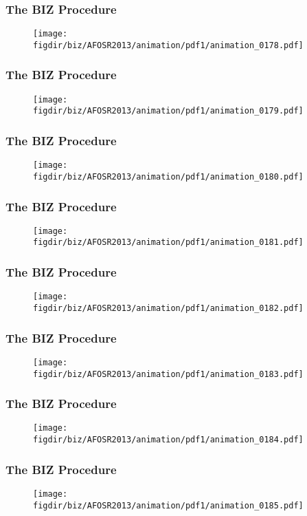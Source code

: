 \documentclass[13pt]{beamer}
\newcommand{\figdir}{../../fig}
\begin{document}
\begin{frame}\frametitle{The BIZ Procedure}\begin{figure}\texttt{[image: \\figdir/biz/AFOSR2013/animation/pdf1/animation\_0178.pdf]}\end{figure}\end{frame}
\begin{frame}\frametitle{The BIZ Procedure}\begin{figure}\texttt{[image: \\figdir/biz/AFOSR2013/animation/pdf1/animation\_0179.pdf]}\end{figure}\end{frame}
\begin{frame}\frametitle{The BIZ Procedure}\begin{figure}\texttt{[image: \\figdir/biz/AFOSR2013/animation/pdf1/animation\_0180.pdf]}\end{figure}\end{frame}
\begin{frame}\frametitle{The BIZ Procedure}\begin{figure}\texttt{[image: \\figdir/biz/AFOSR2013/animation/pdf1/animation\_0181.pdf]}\end{figure}\end{frame}
\begin{frame}\frametitle{The BIZ Procedure}\begin{figure}\texttt{[image: \\figdir/biz/AFOSR2013/animation/pdf1/animation\_0182.pdf]}\end{figure}\end{frame}
\begin{frame}\frametitle{The BIZ Procedure}\begin{figure}\texttt{[image: \\figdir/biz/AFOSR2013/animation/pdf1/animation\_0183.pdf]}\end{figure}\end{frame}
\begin{frame}\frametitle{The BIZ Procedure}\begin{figure}\texttt{[image: \\figdir/biz/AFOSR2013/animation/pdf1/animation\_0184.pdf]}\end{figure}\end{frame}
\begin{frame}\frametitle{The BIZ Procedure}\begin{figure}\texttt{[image: \\figdir/biz/AFOSR2013/animation/pdf1/animation\_0185.pdf]}\end{figure}\end{frame}
\end{document}
